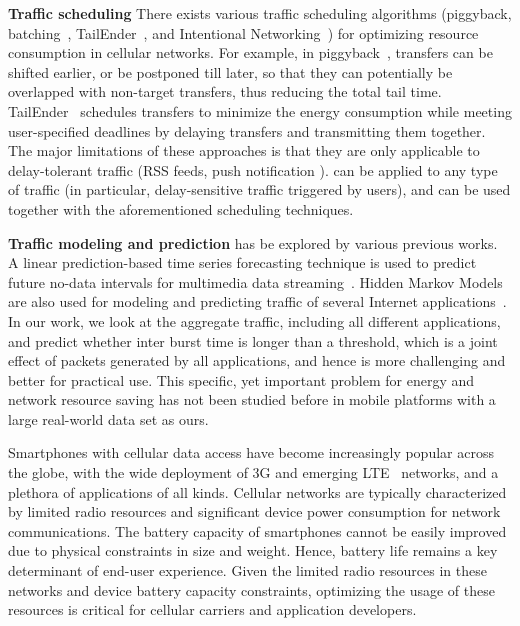 \textbf{Traffic scheduling} There exists various traffic scheduling algorithms (\eg piggyback, batching~\cite{qian12_www}, TailEnder~\cite{imc.tailender}, and Intentional Networking~\cite{higgins10}) for optimizing resource consumption in cellular networks. For example, in piggyback~\cite{qian12_www}, transfers can be shifted earlier, or be postponed till later, so that they can potentially be overlapped with non-target transfers, thus reducing the total tail time. TailEnder~\cite{imc.tailender} schedules transfers to minimize the energy consumption while meeting user-specified deadlines by delaying transfers and transmitting them together. The major limitations of these approaches is that they are only applicable to delay-tolerant traffic (RSS feeds, push notification \etc). \NAME can be applied to any type of traffic (in particular, delay-sensitive traffic triggered by users), and can be used together with the aforementioned scheduling techniques.

\textbf{Traffic modeling and prediction} has be explored by various previous works. A linear prediction-based time series forecasting technique is used to predict future no-data intervals for multimedia data streaming~\cite{wcnc04}. Hidden Markov Models are also used for modeling and predicting traffic of several Internet applications~\cite{Dainotti20082645}. In our work, we look at the aggregate traffic, including all different applications, and predict whether inter burst time is longer than a threshold, which is a joint effect of packets generated by all applications, and hence is more challenging and better for practical use. This specific, yet important problem for energy and network resource saving has not been studied before in mobile platforms with a large real-world data set as ours.



Smartphones with cellular data access have become increasingly popular across the globe, with the wide deployment of 3G and emerging LTE~\cite{3gpp.lte} networks, and a plethora of applications of all kinds. Cellular networks are typically characterized by limited radio resources and significant device power consumption for network communications. The battery capacity of smartphones cannot be easily improved due to physical constraints in size and weight. Hence, battery life remains a key determinant of end-user experience. Given the limited radio resources in these networks and device battery capacity constraints, optimizing the usage of these resources is critical for cellular carriers and application developers.

